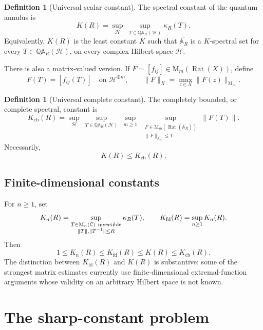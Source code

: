 \documentclass[11pt]{article}
\theoremstyle{definition}
\newtheorem{definition}[theorem]{Definition}
\theoremstyle{remark}
\newcommand{\C}{\mathbb C}
\newcommand{\AR}{\mathbb A_R}
\newcommand{\QAR}{\mathbb Q\mathbb A_R}
\newcommand{\Rat}{\operatorname{Rat}}
\newcommand{\cb}{\mathrm{cb}}
\newcommand{\fd}{\mathrm{fd}}
\newcommand{\Mat}{\mathrm M}
\begin{document}
\begin{definition}[Universal scalar constant]
\label{def:universal-constant}
The spectral constant of the quantum annulus is
\begin{equation}
 K(R)
 =
 \sup_{\mathcal H}
 \ \sup_{T\in\QAR(\mathcal H)}
 \kappa_R(T).
 \label{eq:K-def}
\end{equation}
Equivalently, \(K(R)\) is the least constant \(K\) such that
\(\overline{\AR}\) is a \(K\)-spectral set for every
\(T\in\QAR(\mathcal H)\), on every complex Hilbert space
\(\mathcal H\).
\end{definition}

There is also a matrix-valued version.  If
\(F=[f_{ij}]\in\Mat_m(\Rat(X))\), define
\[
 F(T)=[f_{ij}(T)]
 \quad\text{on }\mathcal H^{\oplus m},
 \qquad
 \|F\|_X=\max_{z\in X}\|F(z)\|_{\Mat_m}.
\]

\begin{definition}[Universal complete constant]
\label{def:complete-constant}
The completely bounded, or complete spectral, constant is
\begin{equation}
 K_{\cb}(R)
 =
 \sup_{\mathcal H}
 \ \sup_{T\in\QAR(\mathcal H)}
 \ \sup_{m\geq1}
 \ \sup_{\substack{F\in\Mat_m(\Rat(\overline{\AR}))\\
                   \|F\|_{\overline{\AR}}\leq1}}
 \|F(T)\|.
 \label{eq:Kcb-def}
\end{equation}
Necessarily,
\[
 K(R)\leq K_{\cb}(R).
\]
\end{definition}

\subsection{Finite-dimensional constants}

For \(n\geq1\), set
\[
 K_n(R)
 =
 \sup_{\substack{T\in\Mat_n(\C)\ {\rm invertible}\\
                  \|T\|,\|T^{-1}\|\leq R}}
 \kappa_R(T),
 \qquad
 K_{\fd}(R)=\sup_{n\geq1}K_n(R).
\]
Then
\begin{equation}
 1\leq K_n(R)\leq K_{\fd}(R)\leq K(R)\leq K_{\cb}(R).
 \label{eq:constant-hierarchy}
\end{equation}
The distinction between \(K_{\fd}(R)\) and \(K(R)\) is substantive:
some of the strongest matrix estimates currently use
finite-dimensional extremal-function arguments whose validity on an
arbitrary Hilbert space is not known.

\section{The sharp-constant problem}
\end{document}
